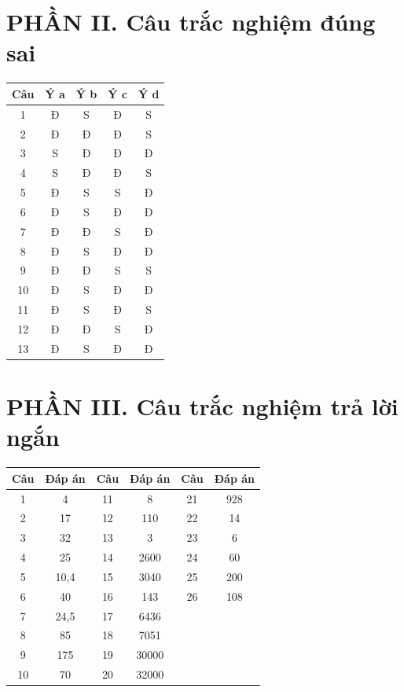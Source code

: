 \documentclass[12pt]{article}
\begin{document}
\section*{PHẦN II. Câu trắc nghiệm đúng sai}
\begin{center}
	\begin{tabular}{|c|c|c|c|c|}
		\hline
		\textbf{Câu} & \textbf{Ý a} & \textbf{Ý b} & \textbf{Ý c} & \textbf{Ý d} \\
		\hline
		1 & Đ & S & Đ & S \\
		\hline
		2 & Đ & Đ & Đ & S \\
		\hline
		3 & S & Đ & Đ & Đ \\
		\hline
		4 & S & Đ & Đ & S \\
		\hline
		5 & Đ & S & S & Đ \\
		\hline
		6 & Đ & S & Đ & Đ \\
		\hline
		7 & Đ & Đ & S & Đ \\
		\hline
		8 & Đ & S & Đ & Đ \\
		\hline
		9 & Đ & Đ & S & S \\
		\hline
		10 & Đ & S & Đ & Đ \\
		\hline
		11 & Đ & S & Đ & S \\
		\hline
		12 & Đ & Đ & S & Đ \\
		\hline
		13 & Đ & S & Đ & Đ \\
		\hline
	\end{tabular}
\end{center}

\section*{PHẦN III. Câu trắc nghiệm trả lời ngắn}
\begin{center}
	\begin{tabular}{|c|c|c|c|c|c|}
		\hline
		\textbf{Câu} & \textbf{Đáp án} & \textbf{Câu} & \textbf{Đáp án} & \textbf{Câu} & \textbf{Đáp án} \\
		\hline
		1 & 4 & 11 & 8 & 21 & 928 \\
		\hline
		2 & 17 & 12 & 110 & 22 & 14 \\
		\hline
		3 & 32 & 13 & 3 & 23 & 6 \\
		\hline
		4 & 25 & 14 & 2600 & 24 & 60 \\
		\hline
		5 & 10,4 & 15 & 3040 & 25 & 200 \\
		\hline
		6 & 40 & 16 & 143 & 26 & 108 \\
		\hline
		7 & 24,5 & 17 & 6436 & & \\
		\hline
		8 & 85 & 18 & 7051 & & \\
		\hline
		9 & 175 & 19 & 30000 & & \\
		\hline
		10 & 70 & 20 & 32000 & & \\
		\hline
	\end{tabular}
\end{center}
\end{document}
